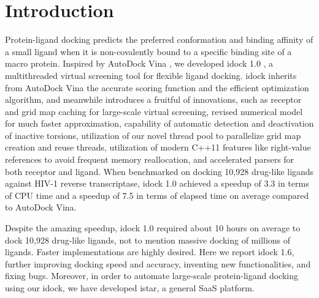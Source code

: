 \documentclass{bioinfo}
\begin{document}
\section{Introduction}

Protein-ligand docking predicts the preferred conformation and binding affinity of a small ligand when it is non-covalently bound to a specific binding site of a macro protein. Inspired by AutoDock Vina \citep{595}, we developed idock 1.0 \citep{1153}, a multithreaded virtual screening tool for flexible ligand docking. idock inherits from AutoDock Vina the accurate scoring function and the efficient optimization algorithm, and meanwhile introduces a fruitful of innovations, such as receptor and grid map caching for large-scale virtual screening, revised numerical model for much faster approximation, capability of automatic detection and deactivation of inactive torsions, utilization of our novel thread pool to parallelize grid map creation and reuse threads, utilization of modern C++11 features like right-value references to avoid frequent memory reallocation, and accelerated parsers for both receptor and ligand. When benchmarked on docking 10,928 drug-like ligands against HIV-1 reverse transcriptase, idock 1.0 achieved a speedup of 3.3 in terms of CPU time and a speedup of 7.5 in terms of elapsed time on average compared to AutoDock Vina.

Despite the amazing speedup, idock 1.0 required about 10 hours on average to dock 10,928 drug-like ligands, not to mention massive docking of millions of ligands. Faster implementations are highly desired. Here we report idock 1.6, further improving docking speed and accuracy, inventing new functionalities, and fixing bugs. Moreover, in order to automate large-scale protein-ligand docking using our idock, we have developed istar, a general SaaS platform.
\end{document}
